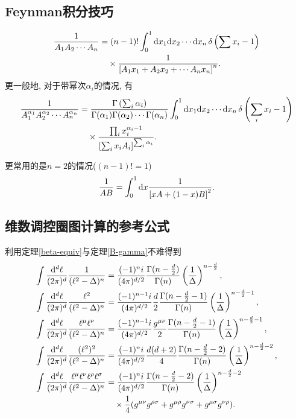\subsection{Feynman积分技巧}
\begin{theorem}[Feynman积分公式]\label{feynman-trick}
    \begin{align}
        \frac1{A_1A_2\cdots A_n}&=(n-1)!\int_0^1\mathrm dx_1\mathrm dx_2\cdots\mathrm dx_n\,\delta\left(\sum x_i-1\right)\notag\\
        &\quad\times\frac1{\left[A_1x_1+A_2x_2+\cdots A_nx_n\right]^n}.
    \end{align}
    更一般地, 对于带幂次$\alpha_i$的情况, 有
    \begin{align}
        \frac1{A_1^{\alpha_1}A_2^{\alpha_2}\cdots A_n^{\alpha_n}}&=\frac{\Gamma\left(\sum_i\alpha_i\right)}{\Gamma(\alpha_1)\Gamma(\alpha_2)\cdots\Gamma(\alpha_n)}\int_0^1\mathrm dx_1\mathrm dx_2\cdots\mathrm dx_n\,\delta\left(\sum_i x_i-1\right)\notag\\
        &\quad\times\frac{\prod_i x_i^{\alpha_i-1}}{\left[\sum_i x_iA_i\right]^{\sum_i\alpha_i}}.
    \end{align}
\end{theorem}
更常用的是$n=2$的情况($(n-1)!=1$)
\begin{align}
    \frac1{AB}=\int_0^1\mathrm dx\frac1{\left[xA+(1-x)B\right]^2}.
\end{align}

\subsection{维数调控圈图计算的参考公式}\label{dim-reg-loop-refer}
利用定理\ref{beta-equiv}与定理\ref{B-gamma}不难得到
\begin{align}
    \int \frac{\mathrm d^{d}\ell}{(2\pi)^{d}} \frac{1}{(\ell^2 - \Delta)^n} &= \frac{(-1)^n i}{(4\pi)^{d/2}} \frac{\Gamma(n-\frac{d}{2})}{\Gamma(n)} \left(\frac{1}{\Delta}\right)^{n-\frac{d}{2}}, \\
    \int \frac{\mathrm d^{d}\ell}{(2\pi)^{d}} \frac{\ell^2}{(\ell^2 - \Delta)^n} &= \frac{(-1)^{n-1} i}{(4\pi)^{d/2}} \frac{d}{2} \frac{\Gamma(n-\frac{d}{2}-1)}{\Gamma(n)} \left(\frac{1}{\Delta}\right)^{n-\frac{d}{2}-1}, \\
    \int \frac{\mathrm d^{d}\ell}{(2\pi)^{d}} \frac{\ell^\mu \ell^\nu}{(\ell^2 - \Delta)^n} &= \frac{(-1)^{n-1} i}{(4\pi)^{d/2}} \frac{g^{\mu\nu}}{2} \frac{\Gamma(n-\frac{d}{2}-1)}{\Gamma(n)} \left(\frac{1}{\Delta}\right)^{n-\frac{d}{2}-1}, \\
    \int \frac{\mathrm d^{d}\ell}{(2\pi)^{d}} \frac{(\ell^2)^2}{(\ell^2 - \Delta)^n} &= \frac{(-1)^n i}{(4\pi)^{d/2}} \frac{d(d+2)}{4} \frac{\Gamma(n-\frac{d}{2}-2)}{\Gamma(n)} \left(\frac{1}{\Delta}\right)^{n-\frac{d}{2}-2}, \\
    \int \frac{\mathrm d^{d}\ell}{(2\pi)^{d}} \frac{\ell^\mu \ell^\nu \ell^\rho \ell^\sigma}{(\ell^2 - \Delta)^n} &= \frac{(-1)^n i}{(4\pi)^{d/2}} \frac{\Gamma(n-\frac{d}{2}-2)}{\Gamma(n)} \left(\frac{1}{\Delta}\right)^{n-\frac{d}{2}-2} \notag \\
    & \quad \times \frac{1}{4} (g^{\mu\nu}g^{\rho\sigma} + g^{\mu\rho}g^{\nu\sigma} + g^{\mu\sigma}g^{\nu\rho}).
\end{align}